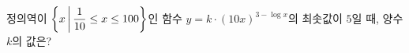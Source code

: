 정의역이 $\left\{x \mkern3mu \middle|\mkern3mu  \dfrac{1}{10}\le x\le 100\right\}$인 함수 $y=k \cdot (10x)^{3-\log x}$의 최솟값이 $5$일 때, 양수 $k$의 값은?
